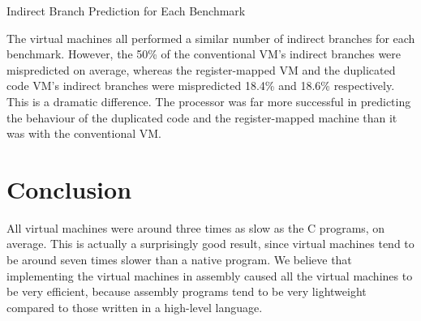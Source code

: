 \begin{myfigure}
			
			\caption{Indirect Branch Prediction for Each Benchmark}
			\label{fig:btbgraph}
		\end{myfigure}
		
		The virtual machines all performed a similar number of indirect branches for each benchmark. However, the 50\% of the conventional VM's indirect branches were mispredicted on average, whereas the register-mapped VM and the duplicated code VM's indirect branches were mispredicted 18.4\% and 18.6\% respectively. This is a dramatic difference. The processor was far more successful in predicting the behaviour of the duplicated code and the register-mapped machine than it was with the conventional VM.
		
\chapter{Conclusion}
	All virtual machines were around three times as slow as the C programs, on average. This is actually a surprisingly good result, since virtual machines tend to be around seven times slower than a native program. We believe that implementing the virtual machines in assembly caused all the virtual machines to be very efficient, because assembly programs tend to be very lightweight compared to those written in a high-level language.
	
